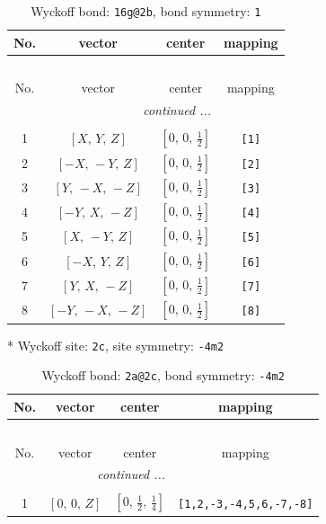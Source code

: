 \documentclass[fleqn,8pt]{jsarticle}
\begin{document}
\begin{longtable}{cccc}
\caption{Wyckoff bond: {\tt 16g@2b}, bond symmetry: {\tt 1}}
 \\
 \hline \hline
No. & vector & center & mapping \\ \hline \endfirsthead

\multicolumn{3}{l}{\tablename\ \thetable{}} \\
 \hline \hline
No. & vector & center & mapping \\ \hline \endhead

 \hline \hline
\multicolumn{3}{r}{\footnotesize\it continued ...} \\ \endfoot

 \hline \hline
\multicolumn{3}{r}{} \\ \endlastfoot

1 & $\left[ X,\, Y,\, Z \right]$ & $\left[ 0,\, 0,\, \frac{1}{2} \right]$ & {\tt [1]} \\ \hline
2 & $\left[ - X,\, - Y,\, Z \right]$ & $\left[ 0,\, 0,\, \frac{1}{2} \right]$ & {\tt [2]} \\ \hline
3 & $\left[ Y,\, - X,\, - Z \right]$ & $\left[ 0,\, 0,\, \frac{1}{2} \right]$ & {\tt [3]} \\ \hline
4 & $\left[ - Y,\, X,\, - Z \right]$ & $\left[ 0,\, 0,\, \frac{1}{2} \right]$ & {\tt [4]} \\ \hline
5 & $\left[ X,\, - Y,\, Z \right]$ & $\left[ 0,\, 0,\, \frac{1}{2} \right]$ & {\tt [5]} \\ \hline
6 & $\left[ - X,\, Y,\, Z \right]$ & $\left[ 0,\, 0,\, \frac{1}{2} \right]$ & {\tt [6]} \\ \hline
7 & $\left[ Y,\, X,\, - Z \right]$ & $\left[ 0,\, 0,\, \frac{1}{2} \right]$ & {\tt [7]} \\ \hline
8 & $\left[ - Y,\, - X,\, - Z \right]$ & $\left[ 0,\, 0,\, \frac{1}{2} \right]$ & {\tt [8]} \\
\end{longtable}
* Wyckoff site: {\tt 2c}, site symmetry: {\tt -4m2}
\renewcommand{\arraystretch}{1.2}
\begin{longtable}{cccc}
\caption{Wyckoff bond: {\tt 2a@2c}, bond symmetry: {\tt -4m2}}
 \\
 \hline \hline
No. & vector & center & mapping \\ \hline \endfirsthead

\multicolumn{3}{l}{\tablename\ \thetable{}} \\
 \hline \hline
No. & vector & center & mapping \\ \hline \endhead

 \hline \hline
\multicolumn{3}{r}{\footnotesize\it continued ...} \\ \endfoot

 \hline \hline
\multicolumn{3}{r}{} \\ \endlastfoot

1 & $\left[ 0,\, 0,\, Z \right]$ & $\left[ 0,\, \frac{1}{2},\, \frac{1}{4} \right]$ & {\tt [1,2,-3,-4,5,6,-7,-8]} \\
\end{longtable}
\end{document}
